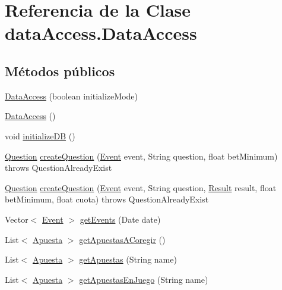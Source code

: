 \hypertarget{classdataAccess_1_1DataAccess}{}\section{Referencia de la Clase data\+Access.\+Data\+Access}
\label{classdataAccess_1_1DataAccess}
\subsection*{Métodos públicos}
\begin{DoxyCompactItemize}
\item 
\mbox{\hyperlink{classdataAccess_1_1DataAccess_a7999ee5a7ac4f0295bd0b7764e4f57cf}{Data\+Access}} (boolean initialize\+Mode)
\item 
\mbox{\hyperlink{classdataAccess_1_1DataAccess_a4f66a4eefd8656ede2ffc4403af77346}{Data\+Access}} ()
\item 
void \mbox{\hyperlink{classdataAccess_1_1DataAccess_ab0490e80b8f3400fe2d8817abcf058c4}{initialize\+DB}} ()
\item 
\mbox{\hyperlink{classdomain_1_1Question}{Question}} \mbox{\hyperlink{classdataAccess_1_1DataAccess_aa95fb0fff37552792eebd76fd72c1124}{create\+Question}} (\mbox{\hyperlink{classdomain_1_1Event}{Event}} event, String question, float bet\+Minimum)  throws Question\+Already\+Exist 
\item 
\mbox{\hyperlink{classdomain_1_1Question}{Question}} \mbox{\hyperlink{classdataAccess_1_1DataAccess_a523948f1328335ae6d3696e524f6e07f}{create\+Question}} (\mbox{\hyperlink{classdomain_1_1Event}{Event}} event, String question, \mbox{\hyperlink{classdomain_1_1Result}{Result}} result, float bet\+Minimum, float cuota)  throws Question\+Already\+Exist 
\item 
Vector$<$ \mbox{\hyperlink{classdomain_1_1Event}{Event}} $>$ \mbox{\hyperlink{classdataAccess_1_1DataAccess_a7a231727a793a72a023c712401927b08}{get\+Events}} (Date date)
\item 
List$<$ \mbox{\hyperlink{classdomain_1_1Apuesta}{Apuesta}} $>$ \mbox{\hyperlink{classdataAccess_1_1DataAccess_a88866886bc2985dda742480a1f59b7a0}{get\+Apuestas\+A\+Coregir}} ()
\item 
List$<$ \mbox{\hyperlink{classdomain_1_1Apuesta}{Apuesta}} $>$ \mbox{\hyperlink{classdataAccess_1_1DataAccess_a8dd36f4110c603f6c0eb90d851e09547}{get\+Apuestas}} (String name)
\item 
List$<$ \mbox{\hyperlink{classdomain_1_1Apuesta}{Apuesta}} $>$ \mbox{\hyperlink{classdataAccess_1_1DataAccess_a97076c683383ccb766d5f410dfffbff1}{get\+Apuestas\+En\+Juego}} (String name)

\end{DoxyCompactItemize}
